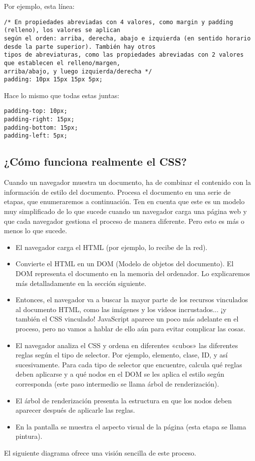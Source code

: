 Por ejemplo, esta línea:

\begin{lstlisting}
/* En propiedades abreviadas con 4 valores, como margin y padding (relleno), los valores se aplican
según el orden: arriba, derecha, abajo e izquierda (en sentido horario desde la parte superior). También hay otros
tipos de abreviaturas, como las propiedades abreviadas con 2 valores que establecen el relleno/margen,
arriba/abajo, y luego izquierda/derecha */
padding: 10px 15px 15px 5px;
\end{lstlisting}

Hace lo mismo que todas estas juntas:

\begin{lstlisting}
padding-top: 10px;
padding-right: 15px;
padding-bottom: 15px;
padding-left: 5px;
\end{lstlisting}

\subsection{¿Cómo funciona realmente el CSS?}

Cuando un navegador muestra un documento, ha de combinar el contenido con la información de estilo del documento. Procesa el documento en una serie de etapas, que enumeraremos a continuación. Ten en cuenta que este es un modelo muy simplificado de lo que sucede cuando un navegador carga una página web y que cada navegador gestiona el proceso de manera diferente. Pero esto es más o menos lo que sucede.

\begin{itemize}
	\item El navegador carga el HTML (por ejemplo, lo recibe de la red).
	\item Convierte el HTML en un DOM (Modelo de objetos del documento). El DOM representa el documento en la memoria del ordenador. Lo explicaremos más detalladamente en la sección siguiente.
	\item Entonces, el navegador va a buscar la mayor parte de los recursos vinculados al documento HTML, como las imágenes y los videos incrustados... ¡y también el CSS vinculado! JavaScript aparece un poco más adelante en el proceso, pero no vamos a hablar de ello aún para evitar complicar las cosas.
	\item El navegador analiza el CSS y ordena en diferentes «cubos» las diferentes reglas según el tipo de selector. Por ejemplo, elemento, clase, ID, y así sucesivamente. Para cada tipo de selector que encuentre, calcula qué reglas deben aplicarse y a qué nodos en el DOM se les aplica el estilo según corresponda (este paso intermedio se llama árbol de renderización).
	\item El árbol de renderización presenta la estructura en que los nodos deben aparecer después de aplicarle las reglas.
	\item En la pantalla se muestra el aspecto visual de la página (esta etapa se llama pintura).
	
	
\end{itemize}
El siguiente diagrama ofrece una visión sencilla de este proceso.

